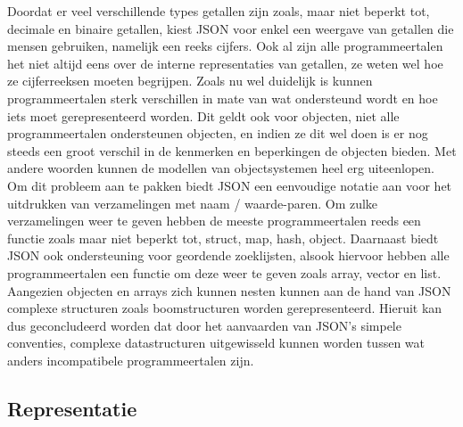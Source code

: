 Doordat er veel verschillende types getallen zijn zoals, maar niet beperkt tot, decimale en binaire getallen, kiest JSON voor enkel een weergave van getallen die mensen gebruiken, namelijk een reeks cijfers. Ook al zijn alle programmeertalen het niet altijd eens over de interne representaties van getallen, ze weten wel hoe ze cijferreeksen moeten begrijpen.
Zoals nu wel duidelijk is kunnen programmeertalen sterk verschillen in mate van wat ondersteund wordt en hoe iets moet gerepresenteerd worden. Dit geldt ook voor objecten, niet alle programmeertalen ondersteunen objecten, en indien ze dit wel doen is er nog steeds een groot verschil in de kenmerken en beperkingen de objecten bieden. Met andere woorden kunnen de modellen van objectsystemen heel erg uiteenlopen. Om dit probleem aan te pakken biedt JSON een eenvoudige notatie aan voor het uitdrukken van verzamelingen met naam / waarde-paren. Om zulke verzamelingen weer te geven hebben de meeste programmeertalen reeds een functie zoals maar niet beperkt tot, struct, map, hash, object.
Daarnaast biedt JSON ook ondersteuning voor geordende zoeklijsten, alsook hiervoor hebben alle programmeertalen een functie om deze weer te geven zoals array, vector en list. Aangezien objecten en arrays zich kunnen nesten kunnen aan de hand van JSON complexe structuren zoals boomstructuren worden gerepresenteerd.
Hieruit kan dus geconcludeerd worden dat door het aanvaarden van JSON's simpele conventies, complexe datastructuren uitgewisseld kunnen worden tussen wat anders incompatibele programmeertalen zijn.



\subsection{Representatie}
\label{subsec:Representatie}





